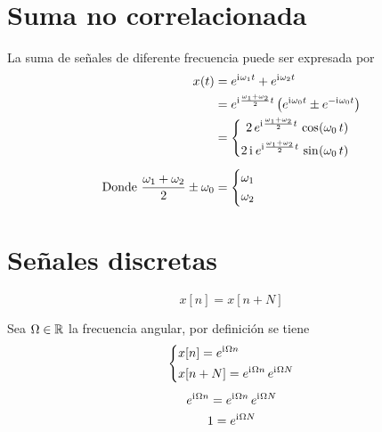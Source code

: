 \section{Suma no correlacionada}

La suma de señales de diferente frecuencia puede ser expresada por
\begin{align*}
    \fx[x]{t} &= e^{\iu \omega_1 t} + e^{\iu \omega_2 t}
    \\
    &= e^{\iu \frac{\omega_1 + \omega_2}{2} t} \left( e^{\iu \omega_0 t} \pm e^{-\iu \omega_0 t} \right)
    \\
    &= \left\{
    \begin{aligned}
        2 \, e^{\iu \frac{\omega_1 + \omega_2}{2} t} \, \fx[\cos]{\omega_0 \, t}
        \\
        2 \, \iu \, e^{\iu \frac{\omega_1 + \omega_2}{2} t} \, \fx[\sin]{\omega_0 \, t}
    \end{aligned}
    \right.
    \\[1ex]
    \text{Donde } \frac{\omega_1+\omega_2}{2} \pm \omega_0 &=
    \left\{
    \begin{aligned}
        & \omega_1
        \\
        & \omega_2
    \end{aligned}
    \right.
\end{align*}


\section{Señales discretas}

\begin{mdframed}[style=MyFrame1]
    \begin{defn}
        \label{defn:funcDiscPeriod}
    \end{defn}
    \begin{equation*}
        x[n] = x[n+N]
    \end{equation*}
\end{mdframed}

Sea $\Omega \in \setR$ la frecuencia angular, por definición se tiene
\begin{gather*}
    \left\{
    \begin{aligned}
        & x[n] = e^{\iu \Omega n}
        \\
        & x[n+N] = e^{\iu \Omega n} \, e^{\iu \Omega N}
    \end{aligned}
    \right.
    \\[1ex]
    e^{\iu \Omega n} = e^{\iu \Omega n} \, e^{\iu \Omega N}
    \\
    1 = e^{\iu \Omega N}
\end{gather*}

